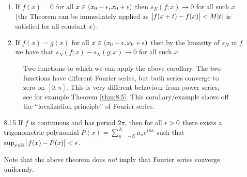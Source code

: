 \begin{ncorollary}{}{}
    \begin{enumerate}
        \item If $f(x) = 0$ for all $x \in (x_0 - \epsilon, x_0 + \epsilon)$ then $s_N(f;x) \rightarrow 0$ for all such $x$ (the Theorem can be immediately applied as $\abs{f(x + t) - f(x)} < M\abs{t}$ is satisfied for all constant $x$).
        \item If $f(x) = g(x)$ for all $x \in (x_0 - \epsilon, x_0 + \epsilon)$ then by the linearity of $s_N$ in $f$ we have that $s_N(f;x) - s_N(g;x) \rightarrow 0$ for all such $x$.
    \end{enumerate}
\end{ncorollary}

\begin{figure}[htbp]
    \centering
    
    \caption{Two functions to which we can apply the above corollary. The two functions have different Fourier series, but both series converge to zero on $[0, \pi]$. This is very different behaviour from power series, see for example Theorem \ref{thm:8.5}. This corollary/example shows off the ``localization principle'' of Fourier series.}
    \label{fig58}
\end{figure}

\begin{theorem}{}{8.15}
    If $f$ is continuous and has period $2\pi$, then for all $\epsilon > 0$ there exists a trigonometric polynomial $P(x) = \sum_{n=-N}^N a_ne^{inx}$ such that $\sup_{x \in \mathbb{R}}\abs{f(x) - P(x)} < \epsilon$.
\end{theorem}
\noindent Note that the above theorem does \emph{not} imply that Fourier series converge uniformly.

